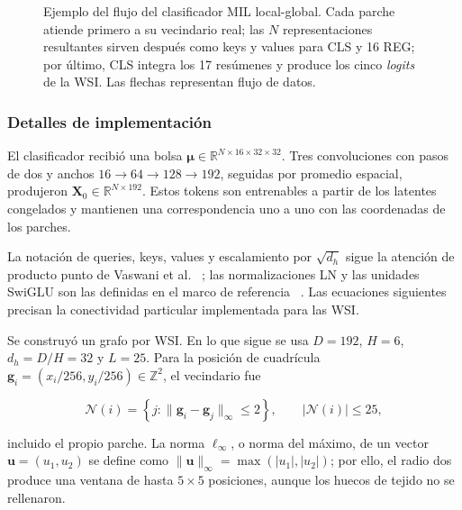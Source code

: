 \begin{figure}[p]
    \centering
    \begingroup{}
    \resizebox{\textwidth}{!}{}
    \endgroup
    \caption{Ejemplo del flujo del clasificador MIL local-global. Cada parche
    atiende primero a su vecindario real; las \(N\) representaciones resultantes
    sirven después como keys y values para CLS y 16 REG; por último, CLS
    integra los 17 resúmenes y produce los cinco \emph{logits} de la WSI. Las flechas representan flujo de datos.}
    \label{fig:mil-local-global-detalle}
\end{figure}

\FloatBarrier

\subsubsection{Detalles de implementación}

El clasificador recibió una bolsa
\(\boldsymbol{\mu}\in\mathbb{R}^{N\times16\times32\times32}\). Tres
convoluciones con pasos de dos y anchos
\(16\rightarrow64\rightarrow128\rightarrow192\), seguidas por promedio
espacial, produjeron
\(\mathbf X_0\in\mathbb{R}^{N\times192}\). Estos tokens son entrenables a
partir de los latentes congelados y mantienen una correspondencia uno a uno
con las coordenadas de los parches.

La notación de queries, keys, values y escalamiento por
\(\sqrt{d_h}\) sigue la atención de producto punto de Vaswani et al.
~\cite{vaswani_attention_2017}; las normalizaciones LN y las unidades SwiGLU
son las definidas en el marco de referencia
~\cite{ba_layernorm_2016,shazeer_glu_2020}. Las ecuaciones siguientes precisan
la conectividad particular implementada para las WSI.

Se construyó un grafo por WSI. En lo que sigue se usa
\(D=192\), \(H=6\), \(d_h=D/H=32\) y \(L=25\). Para la posición de
cuadrícula \(\mathbf g_i=(x_i/256,y_i/256)\in\mathbb Z^2\), el vecindario fue

\begin{equation}
    \mathcal N(i)=\left\{j:
    \lVert\mathbf g_i-\mathbf g_j\rVert_\infty\leq2\right\},
    \qquad |\mathcal N(i)|\leq25,
    \label{eq:vecindario-local-mil}
\end{equation}

incluido el propio parche. La norma \(\ell_\infty\), o norma del máximo, de un vector
\(\mathbf u=(u_1,u_2)\) se define como
\(\lVert\mathbf u\rVert_\infty=\max(|u_1|,|u_2|)\); por ello, el radio dos
produce una ventana de hasta \(5\times5\) posiciones, aunque los huecos de
tejido no se rellenaron.

